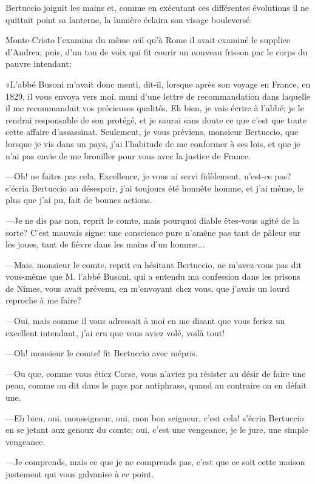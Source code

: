 Bertuccio joignit les mains et, comme en exécutant ces différentes évolutions il ne quittait point sa lanterne, la lumière éclaira son visage bouleversé.  

Monte-Cristo l'examina du même œil qu'à Rome il avait examiné le supplice d'Andrea; puis, d'un ton de voix qui fit courir un nouveau frisson par le corps du pauvre intendant: 

«L'abbé Busoni m'avait donc menti, dit-il, lorsque après son voyage en France, en 1829, il vous envoya vers moi, muni d'une lettre de recommandation dans laquelle il me recommandait vos précieuses qualités. Eh bien, je vais écrire à l'abbé; je le rendrai responsable de son protégé, et je saurai sans doute ce que c'est que toute cette affaire d'assassinat. Seulement, je vous préviens, monsieur Bertuccio, que lorsque je vis dans un pays, j'ai l'habitude de me conformer à ses lois, et que je n'ai pas envie de me brouiller pour vous avec la justice de France.  

—Oh! ne faites pas cela, Excellence, je vous ai servi fidèlement, n'est-ce pas? s'écria Bertuccio au désespoir, j'ai toujours été honnête homme, et j'ai même, le plus que j'ai pu, fait de bonnes actions. 

—Je ne dis pas non, reprit le comte, mais pourquoi diable êtes-vous agité de la sorte? C'est mauvais signe: une conscience pure n'amène pas tant de pâleur sur les joues, tant de fièvre dans les mains d'un homme\dots. 

—Mais, monsieur le comte, reprit en hésitant Bertuccio, ne m'avez-vous pas dit vous-même que M. l'abbé Busoni, qui a entendu ma confession dans les prisons de Nîmes, vous avait prévenu, en m'envoyant chez vous, que j'avais un lourd reproche à me faire?  

—Oui, mais comme il vous adressait à moi en me disant que vous feriez un excellent intendant, j'ai cru que vous aviez volé, voilà tout! 

—Oh! monsieur le comte! fit Bertuccio avec mépris. 

—Ou que, comme vous étiez Corse, vous n'aviez pu résister au désir de faire une peau, comme on dit dans le pays par antiphrase, quand au contraire on en défait une. 

—Eh bien, oui, monseigneur, oui, mon bon seigneur, c'est cela! s'écria Bertuccio en se jetant aux genoux du comte; oui, c'est une vengeance, je le jure, une simple vengeance.  

—Je comprends, mais ce que je ne comprends pas, c'est que ce soit cette maison justement qui vous galvanise à ce point. 

